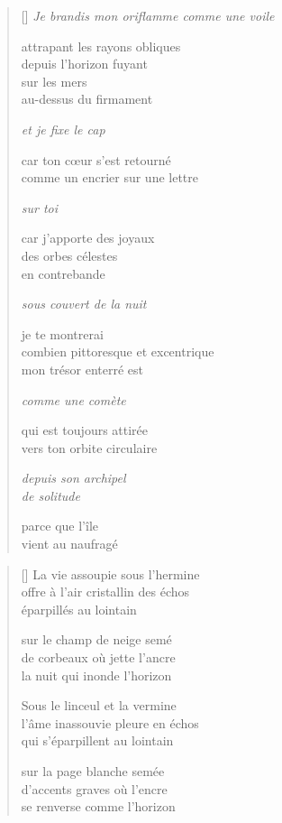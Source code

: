 \documentclass[12pt,a4paper]{article}
\begin{document}
\begin{verse}[\versewidth]
  \emph{Je brandis mon oriflamme comme une voile}

  attrapant les rayons obliques \\
  depuis l'horizon fuyant \\
  sur les mers \\
  au-dessus du firmament

  \emph{et je fixe le cap}

  car ton cœur s'est retourné \\
  comme un encrier sur une lettre

  \emph{sur toi}

  car j'apporte des joyaux \\
  des orbes célestes \\
  en contrebande

  \emph{sous couvert de la nuit}

  je te montrerai \\
  combien pittoresque et excentrique \\
  mon trésor enterré est

  \emph{comme une comète}

  qui est toujours attirée \\
  vers ton orbite circulaire

  \emph{depuis son archipel \\
  de solitude}

  parce que l'île \\
  vient au naufragé
\end{verse}


\newpage

\poemtitle{}

\settowidth{\versewidth}{offre à l'air cristallin des échos}

\bigskip\bigskip

\begin{verse}[\versewidth]
La vie assoupie sous l'hermine \\
offre à l'air cristallin des échos \\
éparpillés au lointain

sur le champ de neige semé \\
de corbeaux où jette l'ancre \\
la nuit qui inonde l'horizon

Sous le linceul et la vermine \\
l'âme inassouvie pleure en échos \\
qui s'éparpillent au lointain

sur la page blanche semée \\
d'accents graves où l'encre \\
se renverse comme l'horizon
\end{verse}
\end{document}
